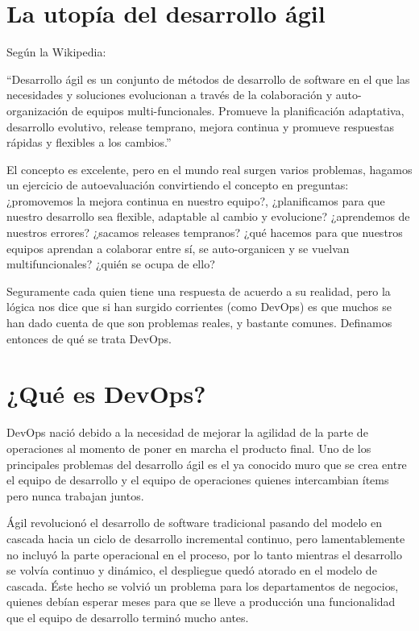 \documentclass[conference]{IEEEtran}
\begin{document}
\section{La utopía del desarrollo ágil}
Según la Wikipedia:

“Desarrollo ágil es un conjunto de métodos de desarrollo de software en el que las necesidades y soluciones evolucionan a través de la colaboración y auto-organización de equipos multi-funcionales. Promueve la planificación adaptativa, desarrollo evolutivo, release temprano, mejora continua y promueve respuestas rápidas y flexibles a los cambios.”

El concepto es excelente, pero en el mundo real surgen varios problemas, hagamos un ejercicio de autoevaluación convirtiendo el concepto en preguntas: ¿promovemos la mejora continua en nuestro equipo?, ¿planificamos para que nuestro desarrollo sea flexible, adaptable al cambio y evolucione? ¿aprendemos de nuestros errores? ¿sacamos releases tempranos? ¿qué hacemos para que nuestros equipos aprendan a colaborar entre sí, se auto-organicen y se vuelvan multifuncionales? ¿quién se ocupa de ello? 

Seguramente cada quien tiene una respuesta de acuerdo a su realidad, pero la lógica nos dice que si han surgido corrientes (como DevOps) es que muchos se han dado cuenta de que son problemas reales, y bastante comunes. Definamos entonces de qué se trata DevOps.

\section{¿Qué es DevOps?}
DevOps nació debido a la necesidad de mejorar la agilidad de la parte de operaciones al momento de poner en marcha el producto final. Uno de los principales problemas del desarrollo ágil es el ya conocido muro que se crea entre el equipo de desarrollo y el equipo de operaciones quienes intercambian ítems pero nunca trabajan juntos.

Ágil revolucionó el desarrollo de software tradicional pasando del modelo en cascada hacia un ciclo de desarrollo incremental continuo, pero lamentablemente no incluyó la parte operacional en el proceso, por lo tanto mientras el desarrollo se volvía continuo y dinámico, el despliegue quedó atorado en el modelo de cascada. Éste hecho se volvió un problema para los departamentos de negocios, quienes debían esperar meses para que se lleve a producción una funcionalidad que el equipo de desarrollo terminó mucho antes.
\end{document}
